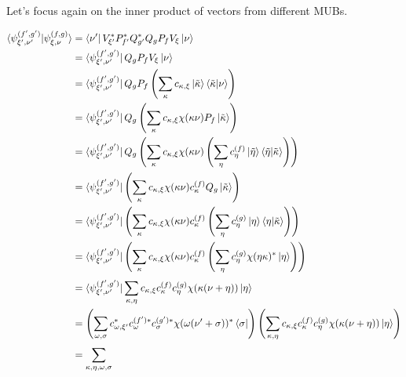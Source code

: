 \documentclass[a4paper]{article}
\begin{document}
  Let's focus again on the inner product of vectors from
  different MUBs.

  \begin{align}
    \braket{\psi_{\xi',\nu'}^{(f',g')}|\psi_{\xi,\nu}^{(f,g)}}
    &= \bra{\nu'} V_{\xi'}^{*} P_{f'}^{*} Q_{g'}^{*}
    Q_{g} P_{f} V_{\xi} \ket{\nu} \\
    &= \bra{\psi_{\xi',\nu'}^{(f',g')}}
    Q_g P_f V_\xi \ket\nu \\
    &= \bra{\psi_{\xi',\nu'}^{(f',g')}}
    Q_g P_f
    \left( \sum_{\kappa}^{} c_{\kappa,\xi}
      \ket{\tilde\kappa}\braket{\tilde\kappa|\nu} \right) \\
    &= \bra{\psi_{\xi',\nu'}^{(f',g')}}
    Q_g
    \left( \sum_{\kappa}^{} c_{\kappa,\xi}
      \chi(\kappa\nu) P_f \ket{\tilde\kappa}  \right) \\
    &= \bra{\psi_{\xi',\nu'}^{(f',g')}} Q_g
    \left( \sum_{\kappa}^{} c_{\kappa,\xi}
      \chi(\kappa\nu) \left( 
        \sum_{\eta}^{} c_{\eta}^{(f)}
        \ket{\tilde\eta}\braket{\tilde\eta|\tilde\kappa}
    \right) \right) \\
    &= \bra{\psi_{\xi',\nu'}^{(f',g')}} 
    \left( \sum_{\kappa}^{} c_{\kappa,\xi}
      \chi(\kappa\nu) 
        c_{\kappa}^{(f)}
        Q_g\ket{\tilde\kappa}
    \right) \\
    &= \bra{\psi_{\xi',\nu'}^{(f',g')}} 
    \left( \sum_{\kappa}^{} c_{\kappa,\xi}
      \chi(\kappa\nu) 
        c_{\kappa}^{(f)}
        \left( 
          \sum_{\eta}^{} c_{\eta}^{(g)}
          \ket{\eta}\braket{\eta|\tilde\kappa}
        \right) 
    \right) \\
    &= \bra{\psi_{\xi',\nu'}^{(f',g')}} 
    \left( \sum_{\kappa}^{} c_{\kappa,\xi}
      \chi(\kappa\nu) 
        c_{\kappa}^{(f)}
        \left( 
          \sum_{\eta}^{} c_{\eta}^{(g)}
          \chi(\eta\kappa)^{*} \ket{\eta}
        \right) 
    \right) \\
    &=
    \bra{\psi_{\xi',\nu'}^{(f',g')}}
    \sum_{\kappa, \eta}^{} 
    c_{\kappa,\xi} 
    c_{\kappa}^{(f)}
    c_{\eta}^{(g)}
    \chi(\kappa(\nu+\eta))
    \ket{\eta} \\
    &=
    \left( 
      \sum_{\omega, \sigma}^{} 
      c_{\omega,\xi'}^{*} 
      c_{\omega}^{(f')*}
      c_{\sigma}^{(g')*}
      \chi(\omega(\nu'+\sigma))^{*}
      \bra{\sigma}
    \right) 
    \left( 
      \sum_{\kappa, \eta}^{} 
      c_{\kappa,\xi} 
      c_{\kappa}^{(f)}
      c_{\eta}^{(g)}
      \chi(\kappa(\nu+\eta))
      \ket{\eta}
    \right) \\
    &= 
    \sum_{\kappa,\eta,\omega,\sigma}^{} 

\end{align}
\end{document}
